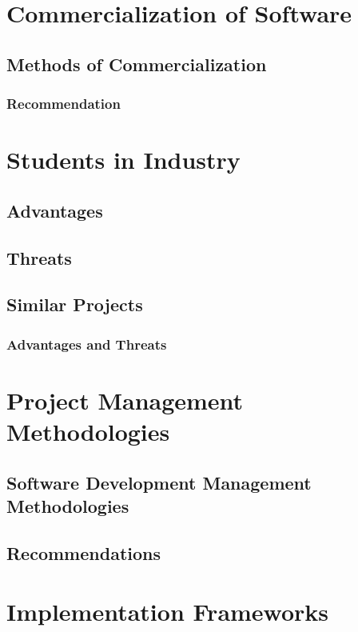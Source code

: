 \section{Commercialization of Software}
\subsection{Methods of Commercialization}
\subsubsection{Recommendation}
\section{Students in Industry}
\subsection{Advantages}
\subsection{Threats}
\subsection{Similar Projects}
\subsubsection{Advantages and Threats}
\section{Project Management Methodologies}
\subsection{Software Development Management Methodologies}
\subsection{Recommendations}
\section{Implementation Frameworks}
